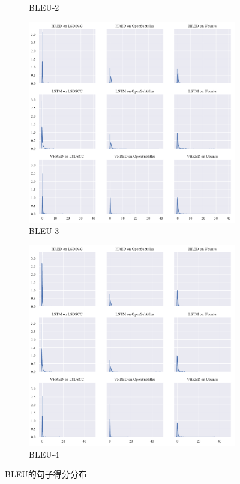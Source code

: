 \begin{figure}[H]
\begin{subfigure}{0.5\linewidth}
        \caption{BLEU-2}
    \end{subfigure}
    \begin{subfigure}{0.5\linewidth}
        \centering
        \includegraphics[width=\linewidth]{figure/distplot_grid/bleu_3/plot.pdf}
        \caption{BLEU-3}
    \end{subfigure}%
    \begin{subfigure}{0.5\linewidth}
        \centering
        \includegraphics[width=\linewidth]{figure/distplot_grid/bleu_4/plot.pdf}
        \caption{BLEU-4}
    \end{subfigure}
    \caption{BLEU的句子得分分布}
\end{figure}
